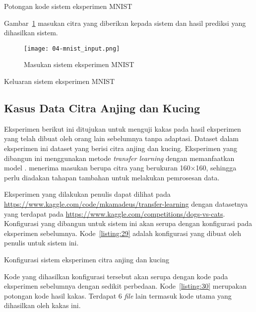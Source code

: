 \begin{code}
	\caption{Potongan kode sistem eksperimen MNIST}\label{listing:27}
\end{code}

Gambar~\ref{fig:04-mnist-input} masukan citra yang diberikan kepada sistem dan hasil prediksi yang dihasilkan sistem.

\begin{figure}[H]
  \vspace{\baselineskip}
    \centering
    \texttt{[image: 04-mnist\_input.png]}
    \caption{Masukan sistem eksperimen MNIST}\label{fig:04-mnist-input}
\end{figure}

\begin{code}
	\caption{Keluaran sistem eksperimen MNIST}\label{listing:28}
\end{code}

\subsection{Kasus Data Citra Anjing dan Kucing}

Eksperimen berikut ini ditujukan untuk menguji kakas pada hasil eksperimen yang telah dibuat oleh orang lain sebelumnya tanpa adaptasi.
Dataset dalam eksperimen ini dataset yang berisi citra anjing dan kucing.
Eksperimen yang dibangun ini menggunakan metode \textit{transfer learning} dengan memanfaatkan model .
 menerima masukan berupa citra yang berukuran 160\(\times\)160, sehingga perlu diadakan tahapan tambahan untuk melakukan pemrosesan data.

Eksperimen yang dilakukan penulis dapat dilihat pada \url{https://www.kaggle.com/code/mkamadeus/transfer-learning} dengan datasetnya yang terdapat pada \url{https://www.kaggle.com/competitions/dogs-vs-cats}.
Konfigurasi yang dibangun untuk sistem ini akan serupa dengan konfigurasi pada eksperimen sebelumnya.
Kode~\ref{listing:29} adalah konfigurasi yang dibuat oleh penulis untuk sistem ini.

\begin{code}
	\caption{Konfigurasi sistem eksperimen citra anjing dan kucing}\label{listing:29}
\end{code}

Kode yang dihasilkan konfigurasi tersebut akan serupa dengan kode pada eksperimen sebelumnya dengan sedikit perbedaan.
Kode~\ref{listing:30} merupakan potongan kode hasil kakas.
Terdapat 6 \textit{file} lain termasuk kode utama yang dihasilkan oleh kakas ini.

